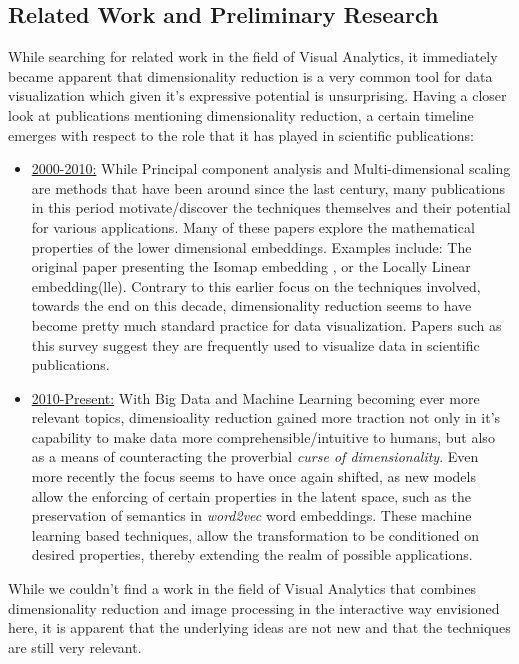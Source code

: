 \documentclass[11pt,a4paper]{article}
\begin{document}
  \subsection{Related Work and Preliminary Research}
    While searching for related work in the field of Visual Analytics, it immediately became apparent that dimensionality reduction is a very common tool for data visualization which given it's expressive potential is unsurprising. 
    Having a closer look at publications mentioning dimensionality reduction, a certain timeline emerges with respect to the role that it has played in scientific publications:
    \begin{itemize}
      \item \underline{2000-2010:} While Principal component analysis and Multi-dimensional scaling are methods that have been around since the last century, many publications in this period motivate/discover the techniques themselves and their potential for various applications. Many of these papers explore the mathematical properties of the lower dimensional embeddings. Examples include: The original paper presenting the Isomap embedding \cite{tenenbaum_global_2000},%
      or the Locally Linear embedding(lle)\cite{roweis_nonlinear_2000}. %
      Contrary to this earlier focus on the techniques involved, towards the end on this decade, dimensionality reduction seems to have become pretty much standard practice for data visualization. Papers such as this survey \cite{zhang_manifold_2010}%
      suggest they are frequently used to visualize data in scientific publications.
      \item \underline{2010-Present:} With Big Data and Machine Learning becoming ever more relevant topics, dimensioality reduction gained more traction not only in it's capability to make data more comprehensible/intuitive to humans, but also as a means of counteracting the proverbial \textit{curse of dimensionality}. Even more recently the focus seems to have once again shifted, as new models allow the enforcing of certain properties in the latent space, such as the preservation of semantics in \textit{word2vec}\cite{mikolov_efficient_2013} %
      word embeddings. These machine learning based techniques, allow the transformation to be conditioned on desired properties, thereby extending the realm of possible applications.
    \end{itemize}

    While we couldn't find a work in the field of Visual Analytics that combines dimensionality reduction and image processing in the interactive way envisioned here, it is apparent that the underlying ideas are not new and that the techniques are still very relevant.
  
\end{document}
